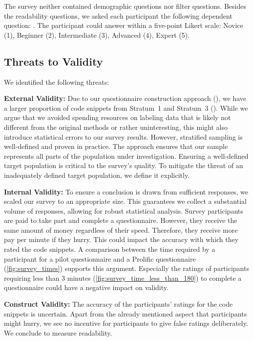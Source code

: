 \documentclass[%
class=scrreprt,
chapterprefix=false,%
open=right,%
twoside=true,%
paper=a4,%
logofile={Logo\_zentral\_farbig\_EN.png},%
thesistype=master,%
UKenglish,%
]{se2thesis}
\theoremstyle{definition}
\begin{document}
    The survey neither contained demographic questions nor filter questions. Besides the readability questions, we asked each participant the following dependent question: . The participant could answer within a five-point Likert scale: Novice (1), Beginner (2), Intermediate (3), Advanced (4), Expert (5).
	
\subsection{Threats to Validity}
	We identified the following threats:
	
	\textbf{External Validity:}
	Due to our questionnaire construction approach (), we have a larger proportion of code snippets from Stratum~1 and Stratum~3 (). While we argue that we avoided spending resources on labeling data that is likely not different from the original methods or rather uninteresting, this might also introduce statistical errors to our survey results.
	However, stratified sampling is well-defined and proven in practice. The approach ensures that our sample represents all parts of the population under investigation.
	Ensuring a well-defined target population is critical to the survey's quality.
	To mitigate the threat of an inadequately defined target population, we define it explicitly.
	
	\textbf{Internal Validity:} 
    To ensure a conclusion is drawn from sufficient responses, we scaled our survey to an appropriate size. This guarantees we collect a substantial volume of responses, allowing for robust statistical analysis.
    Survey participants are paid to take part and complete a questionnaire. However, they receive the same amount of money regardless of their speed. Therefore, they receive more pay per minute if they hurry. This could impact the accuracy with which they rated the code snippets. A comparison between the time required by a participant for a pilot questionnaire and a Prolific questionnaire (\autoref{fig:survey_times}) supports this argument. Especially the ratings of participants requiring less than 3 minutes (\autoref{fig:survey_time_less_than_180}) to complete a questionnaire could have a negative impact on validity. 
    
    \textbf{Construct Validity:}
    The accuracy of the participants' ratings for the code snippets is uncertain. Apart from the already mentioned aspect that participants might hurry, we see no incentive for participants to give false ratings deliberately. We conclude to measure readability.
	
\end{document}
